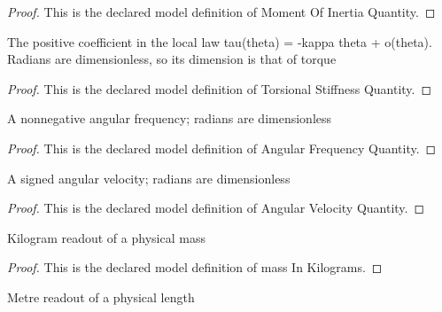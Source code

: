 \begin{proof}
  This is the declared model definition of Moment Of Inertia Quantity.
\end{proof}
\begin{definition}
  \label{def:physics:phyx-mini-0232:phyxminiproblems-problemphyxmini0232-torsionalstiffnessquantity}
  The positive coefficient in the local law tau(theta) = -kappa theta + o(theta). Radians are dimensionless, so its dimension is that of torque
\end{definition}
\begin{proof}
  This is the declared model definition of Torsional Stiffness Quantity.
\end{proof}
\begin{definition}
  \label{def:physics:phyx-mini-0232:phyxminiproblems-problemphyxmini0232-angularfrequencyquantity}
  A nonnegative angular frequency; radians are dimensionless
\end{definition}
\begin{proof}
  This is the declared model definition of Angular Frequency Quantity.
\end{proof}
\begin{definition}
  \label{def:physics:phyx-mini-0232:phyxminiproblems-problemphyxmini0232-angularvelocityquantity}
  A signed angular velocity; radians are dimensionless
\end{definition}
\begin{proof}
  This is the declared model definition of Angular Velocity Quantity.
\end{proof}
\begin{definition}
  \label{def:physics:phyx-mini-0232:phyxminiproblems-problemphyxmini0232-massinkilograms}
  Kilogram readout of a physical mass
\end{definition}
\begin{proof}
  This is the declared model definition of mass In Kilograms.
\end{proof}
\begin{definition}
  \label{def:physics:phyx-mini-0232:phyxminiproblems-problemphyxmini0232-lengthinmeters}
  Metre readout of a physical length
\end{definition}
